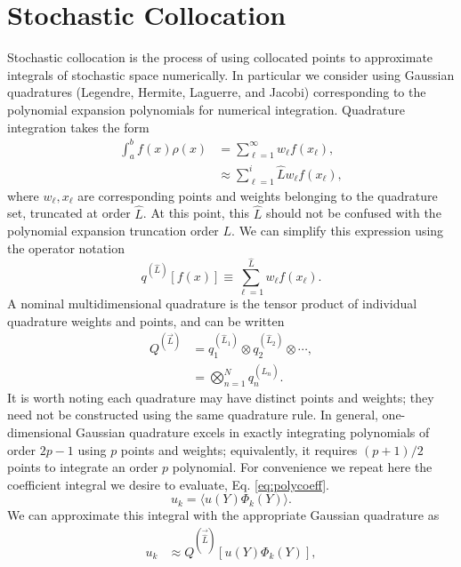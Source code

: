 \section{Stochastic Collocation}\label{sec:stoch coll}
Stochastic collocation is the process of using collocated points to approximate integrals of stochastic space
numerically.  In particular we consider using Gaussian quadratures (Legendre, Hermite, Laguerre, and Jacobi)
corresponding to the polynomial expansion polynomials for numerical integration.  Quadrature integration takes
the form
\begin{align}
  \int_a^b f(x)\rho(x) &= \sum_{\ell=1}^\infty w_\ell f(x_\ell),\\
  &\approx \sum_{\ell=1}^i{\hat L} w_\ell f(x_\ell),
\end{align}
where $w_\ell,x_\ell$ are corresponding points and weights belonging to the quadrature set, truncated at order
$\hat L$.  At this point, this $\hat L$ should not be confused with the polynomial expansion truncation order $L$.  We
can simplify this expression using the operator notation
\begin{equation}\label{eq:quad op}
  q^{(\hat L)}[f(x)] \equiv \sum_{\ell=1}^{\hat L} w_\ell f(x_\ell).
\end{equation}
A nominal multidimensional quadrature is the tensor product of
individual quadrature weights and points, and can be written
\begin{align}
  Q^{(\vec{L})} &= q^{(\hat L_1)}_1 \otimes q^{(\hat L_2)}_2 \otimes \cdots,\\
                     &= \bigotimes_{n=1}^N q^{(\hat L_n)}_n.
\end{align}
It is worth noting each quadrature may have distinct points and weights; they need not be constructed using
the same quadrature rule.
In general, one-dimensional Gaussian
quadrature excels in exactly integrating polynomials of order $2p-1$ using $p$ points and weights;
equivalently, it requires $(p+1)/2$ points to integrate an order $p$ polynomial. 
For convenience we repeat here the coefficient integral we desire to evaluate, Eq.
\ref{eq:polycoeff}.
\begin{equation}
  u_k = \langle u(Y)\Phi_k(Y) \rangle.
\end{equation}
We can approximate this integral with the appropriate Gaussian quadrature as
\begin{align}
  u_k &\approx Q^{(\vec{\hat L})}[u(Y)\Phi_k(Y)],
\end{align}
